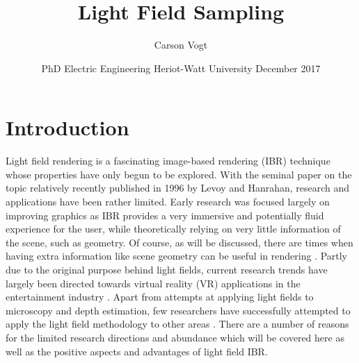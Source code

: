 \documentclass[12pt]{report}
\begin{document}
\title{Light Field Sampling \vspace{2.5cm}}	%
\author{
\Large Carson Vogt \vspace{1cm} \\ 
}

\date{
	\centering
	PhD Electric Engineering \endgraf\medskip
	Heriot-Watt University \endgraf{} December 2017
}

\maketitle

\listoffigures

\tableofcontents

\chapter{Introduction}

Light field rendering is a fascinating image-based rendering (IBR) technique whose properties have only begun to be explored. With the seminal paper on the topic relatively recently published in 1996 by Levoy and Hanrahan\cite{Levoy96}, research and applications have been rather limited. Early research was focused largely on improving graphics as IBR provides a very immersive and potentially fluid experience for the user, while theoretically relying on very little information of the scene, such as geometry. Of course, as will be discussed, there are times when having extra information like scene geometry can be useful in rendering \cite{Gortler96}. Partly due to the original purpose behind light fields, current research trends have largely been directed towards virtual reality (VR) applications in the entertainment industry \cite{Anderson16, Davis12, Kalantari16}. Apart from attempts at applying light fields to microscopy and depth estimation, few researchers have successfully attempted to apply the light field methodology to other areas \cite{Levoy06b}. There are a number of reasons for the limited research directions and abundance which will be covered here as well as the positive aspects and advantages of light field IBR.
\end{document}
